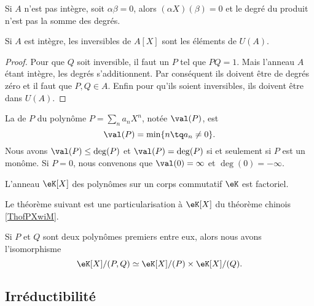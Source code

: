 \begin{remark}
    Si \( A\) n'est pas intègre, soit \( \alpha\beta=0\), alors \( (\alpha X)(\beta)=0\) et le degré du produit n'est pas la somme des degrés.
\end{remark}

\begin{corollary}
    Si \( A\) est intègre, les inversibles de \( A[X]\) sont les éléments de \( U(A)\).
\end{corollary}

\begin{proof}
    Pour que \( Q\) soit inversible, il faut un \( P\) tel que \( PQ=1\). Mais l'anneau \( A\) étant intègre, les degrés s'additionnent. Par conséquent ils doivent être de degrés zéro et il faut que \( P,Q\in A\). Enfin pour qu'ils soient inversibles, ils doivent être dans \( U(A)\).
\end{proof}

La  de \( P\) du polynôme \( P=\sum_n a_nX^n\), notée \( \val(P)\), est 
\begin{equation}
    \val(P)=\min\{ n\tq a_n\neq 0 \}.
\end{equation}
Nous avons \( \val(P)\leq \deg(P)\) et \( \val(P)=\deg(P)\) si et seulement si \( P\) est un monôme. Si \( P=0\), nous convenons que \( \val(0)=\infty\) et \( \deg(0)=-\infty\).

\begin{proposition}     \label{PropqGZXvr}
    L'anneau \( \eK[X]\) des polynômes sur un corps commutatif \( \eK\) est factoriel.
\end{proposition}

Le théorème suivant est une particularisation à \( \eK[X]\) du théorème chinois \ref{ThofPXwiM}.
\begin{theorem}
    Si \( P\) et \( Q\) sont deux polynômes premiers entre eux, alors nous avons l'isomorphisme
    \begin{equation}
        \eK[X]/(P,Q)\simeq\eK[X]/(P)\times \eK[X]/(Q).
    \end{equation}
\end{theorem}

\subsection{Irréductibilité}

